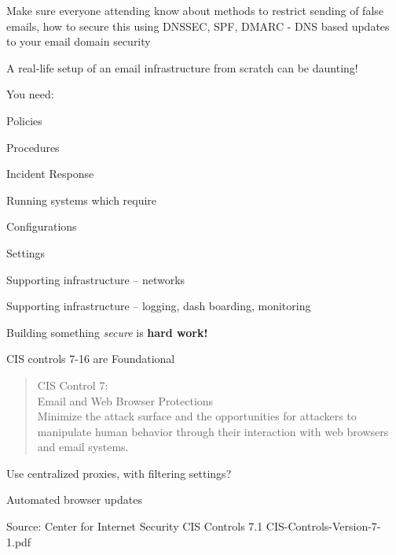 \documentclass[Screen16to9,17pt]{foils}
\begin{document}
Make sure everyone attending know about methods to restrict sending of false
emails, how to secure this using DNSSEC, SPF, DMARC - DNS based updates to your
email domain security


\begin{list1}
\item A real-life setup of an email infrastructure from scratch can be daunting!
\item You need:
\begin{list2}
\item Policies
\item Procedures
\item Incident Response
\end{list2}
\item Running systems which require
\begin{list2}
\item Configurations
\item Settings
\item Supporting infrastructure -- networks
\item Supporting infrastructure -- logging, dash boarding, monitoring
\end{list2}
\item Building something \emph{secure} is {\bf hard work!}
\end{list1}



CIS controls 7-16 are Foundational

\begin{quote}
CIS Control 7:\\
Email and Web Browser Protections\\
Minimize the attack surface and the opportunities for attackers to manipulate human behavior through their interaction with web browsers and email systems.
\end{quote}

\begin{list1}
\item Use centralized proxies, with filtering settings?
\item Automated browser updates
\item
\item
\end{list1}

Source: Center for Internet Security CIS Controls 7.1 CIS-Controls-Version-7-1.pdf
\end{document}
